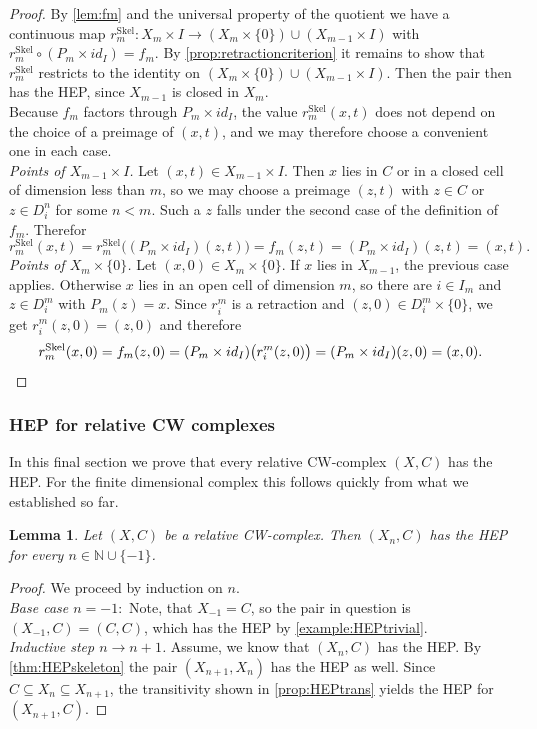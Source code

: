 \documentclass[11pt, a4paper, english]{article}
\theoremstyle{plain}
\newtheorem{lemma}[theorem]{Lemma}
\theoremstyle{definition}
\theoremstyle{remark}
\numberwithin{equation}{section}
\numberwithin{theorem}{section}
\begin{document}
\begin{proof}
By \cref{lem:fm} and the universal property of the quotient we have a continuous map $r^{\mathrm{Skel}}_m \colon X_m \times I \to (X_m \times \{0\}) \cup (X_{m-1} \times I)$ with $r^{\mathrm{Skel}}_m \circ (P_m \times id_I) = f_m$. By \cref{prop:retractioncriterion} it remains to show that $r^{\mathrm{Skel}}_m$ restricts to the identity on $(X_m \times \{0\}) \cup (X_{m-1} \times I)$. Then the pair then has the HEP, since $X_{m-1}$ is closed in $X_m$.\\
Because $f_m$ factors through $P_m \times id_I$, the value $r^{\mathrm{Skel}}_m(x,t)$ does not depend on the choice of a preimage of $(x,t)$, and we may therefore choose a convenient one in each case. \\
\emph{Points of $X_{m-1} \times I$.} Let $(x,t) \in X_{m-1} \times I$. Then $x$ lies in $C$ or in a closed cell of dimension less than $m$, so we may choose a preimage $(z,t)$ with $z \in C$ or $z \in D_i^n$ for some $n < m$. Such a $z$ falls under the second case of the definition of $f_m$. Therefor
    \[
        r^{\mathrm{Skel}}_m(x,t)
        = r^{\mathrm{Skel}}_m\big((P_m \times id_I)(z,t)\big)
        = f_m(z,t) = (P_m \times id_I)(z,t) = (x,t) .
    \] 
\emph{Points of $X_m \times \{0\}$.} Let $(x,0) \in X_m \times \{0\}$. If $x$ lies in $X_{m-1}$, the previous case applies. Otherwise $x$ lies in an open cell of dimension $m$, so there are $i \in I_m$ and $z \in D_i^m$ with $P_m(z) = x$. Since $r_i^m$ is a retraction and $(z,0) \in D_i^m \times \{0\}$, we get $r_i^m(z,0) = (z,0)$ and therefore
    \[
        r^{\mathrm{Skel}}_m(x,0)
        = f_m(z,0)
        = (P_m \times id_I)\big(r_i^m(z,0)\big)
        = (P_m \times id_I)(z,0) = (x,0) . \qedhere
    \]
\end{proof}

\subsubsection{HEP for relative CW complexes} \label{subsubsec:HEP_CW}
In this final section we prove that every relative CW-complex $(X,C)$ has the HEP. For the finite dimensional complex this follows quickly from what we established so far.

\begin{lemma}\label{lem:HEPrelskel}
    Let $(X,C)$ be a relative CW-complex. Then $(X_n,C)$ has the HEP for every $n \in \mathbb{N} \cup \{-1\}$.
\end{lemma}
\begin{proof}
    We proceed by induction on $n$. \\
    \emph{Base case $n = -1 \colon$} Note, that $X_{-1} = C$, so the pair in question is $(X_{-1},C) = (C,C)$, which has the HEP by \cref{example:HEPtrivial}. \\
    \emph{Inductive step $n \to n+1$.} Assume, we know that $(X_n,C)$ has the HEP. By \cref{thm:HEPskeleton} the pair $(X_{n+1}, X_n)$ has the HEP as well. Since $C \subseteq X_n \subseteq X_{n+1}$, the transitivity shown in \cref{prop:HEPtrans} yields the HEP for $(X_{n+1}, C)$.
\end{proof}
\end{document}
